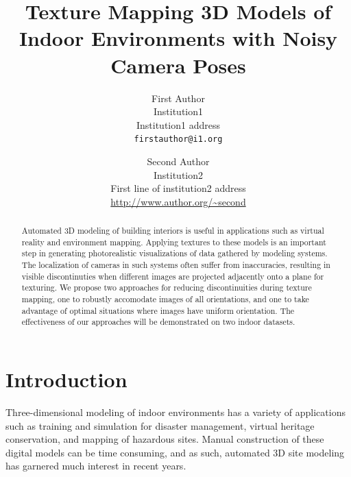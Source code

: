 \message{ !name(paper.tex)}\documentclass[10pt,twocolumn,letterpaper]{article}
\begin{document}


\title{Texture Mapping 3D Models of Indoor Environments with Noisy
  Camera Poses}

\author{First Author\\
  Institution1\\
  Institution1 address\\
  {\tt\small firstauthor@i1.org}
  \and
  Second Author\\
  Institution2\\
  First line of institution2 address\\
  {\small\url{http://www.author.org/~second}} }

\maketitle

\begin{abstract}
  Automated 3D modeling of building interiors is useful in
  applications such as virtual reality and environment
  mapping. Applying textures to these models is an important step in
  generating photorealistic visualizations of data gathered by
  modeling systems.  The localization of cameras in such systems often
  suffer from inaccuracies, resulting in visible discontinuties when
  different images are projected adjacently onto a plane for
  texturing. We propose two approaches for reducing discontinuities
  during texture mapping, one to robustly accomodate images of all
  orientations, and one to take advantage of optimal situations where
  images have uniform orientation. The effectiveness of our approaches
  will be demonstrated on two indoor datasets.
\end{abstract}

\section{Introduction}
\label{sec:introduction}
Three-dimensional modeling of indoor environments has a variety of
applications such as training and simulation for disaster management,
virtual heritage conservation, and mapping of hazardous sites. Manual
construction of these digital models can be time consuming, and as
such, automated 3D site modeling has garnered much interest in recent
years.
\end{document}
